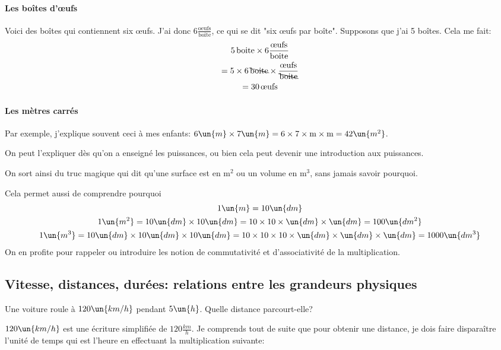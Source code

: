 \paragraph{Les boîtes d'œufs}
Voici des boîtes qui contiennent six œufs.
J'ai donc $6 \frac{\mathrm{oeufs}}{\mathrm{boite}}$, ce qui se dit "six œufs par boîte".
Supposons que j'ai 5 boîtes. Cela me fait:
\begin{gather*}
    5\,\text{boite} \times 6 \frac{\text{œufs}}{\mathrm{boite}} \\
    =5\times6\,\bcancel{\text{boite}}\times\frac{\text{œufs}}{\bcancel{\mathrm{boite}}} \\
    =30\,\text{œufs}
\end{gather*}

\paragraph{Les mètres carrés}
Par exemple, j'explique souvent ceci à mes enfants: $6\un{m}\times7\un{m} = 6\times7\times \mathrm{m} \times \mathrm{m} = 42\un{m^2}$.

On peut l'expliquer dès qu'on a enseigné les puissances, ou bien cela peut devenir une introduction aux puissances.

On sort ainsi du truc magique qui dit qu'une surface est en $\mathrm{m^2}$ ou un volume en $\mathrm{m^3}$, sans jamais savoir pourquoi.

Cela permet aussi de comprendre pourquoi 
\begin{gather*}
    1\un{m} = 10 \un{dm} \\
    1\un{m^2} = 10 \un{dm} \times 10\un{dm} = 10\times 10 \times \un{dm} \times \un{dm} = 100 \un{dm^2} \\
    1\un{m^3} = 10 \un{dm} \times 10\un{dm} \times 10\un{dm} = 10\times 10\times 10 \times \un{dm} \times \un{dm} \times \un{dm} = 1000\un{dm^3}
\end{gather*}
On en profite pour rappeler ou introduire les notion de commutativité et d'associativité de la multiplication.
\subsection{Vitesse, distances, durées: relations entre les grandeurs physiques}
Une voiture roule à $120\un{km/h}$ pendant $5\un{h}$. Quelle distance parcourt-elle?

$120\un{km/h}$ est une écriture simplifiée de $120 \frac{km}{h}$. Je comprends tout de suite que pour obtenir une distance, je dois faire disparaître l'unité de temps qui est l'heure en effectuant la multiplication suivante:

